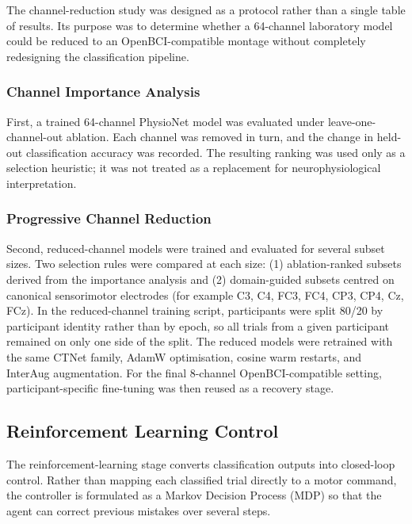 \documentclass[12pt, a4paper]{article}
\begin{document}
The channel-reduction study was designed as a protocol rather than a single table of results. Its purpose was to determine whether a 64-channel laboratory model could be reduced to an OpenBCI-compatible montage without completely redesigning the classification pipeline.

\subsubsection{Channel Importance Analysis}

First, a trained 64-channel PhysioNet model was evaluated under leave-one-channel-out ablation. Each channel was removed in turn, and the change in held-out classification accuracy was recorded. The resulting ranking was used only as a selection heuristic; it was not treated as a replacement for neurophysiological interpretation.

\subsubsection{Progressive Channel Reduction}

Second, reduced-channel models were trained and evaluated for several subset sizes. Two selection rules were compared at each size: (1) ablation-ranked subsets derived from the importance analysis and (2) domain-guided subsets centred on canonical sensorimotor electrodes (for example C3, C4, FC3, FC4, CP3, CP4, Cz, FCz). In the reduced-channel training script, participants were split 80/20 by participant identity rather than by epoch, so all trials from a given participant remained on only one side of the split. The reduced models were retrained with the same CTNet family, AdamW optimisation, cosine warm restarts, and InterAug augmentation. For the final 8-channel OpenBCI-compatible setting, participant-specific fine-tuning was then reused as a recovery stage.

\subsection{Reinforcement Learning Control}

The reinforcement-learning stage converts classification outputs into closed-loop control. Rather than mapping each classified trial directly to a motor command, the controller is formulated as a Markov Decision Process (MDP) so that the agent can correct previous mistakes over several steps.
\end{document}
